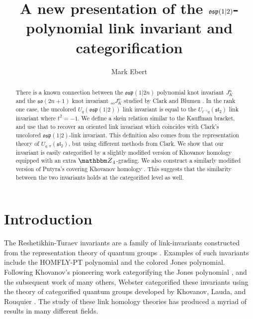 \documentclass{amsart}
\title{A new presentation of the $\mf{osp}(1|2)$-polynomial link invariant and categorification}
\theoremstyle{plain}
\theoremstyle{definition}
\theoremstyle{definition}
\numberwithin{equation}{section}
\numberwithin{theorem}{section}
\def\mf{\mathfrak}
\numberwithin{equation}{section}
\def\Z{{\mathbbm Z}}
\begin{document}
\setcounter{tocdepth}{3}


\author{Mark Ebert}
\address{Department of Mathematics\\ University of Southern California \\ Los Angeles, CA}
%
\maketitle
%
\begin{abstract}
There is a known connection between the $\mf{osp}(1|2n)$ polynomial knot invariant $J_K^n$ and the $\mf{so}(2n+1)$ knot invariant ${}_{so}J_K^n$ studied by Clark \cite{C} and Blumen \cite{Blu09}.
In the rank one case, the uncolored $U_{q}(\mf{osp}(1|2))$ link invariant is equal to the $U_{t^{-1}q}(\mf{sl}_2)$ link invariant where $t^2=-1$.
We define a skein relation similar to the Kauffman bracket, and use that to recover an oriented link invariant which coincides with Clark's uncolored $\mf{osp}(1|2)$-link invariant.
This definition also comes from the representation theory of $U_{q,\pi}(\mf{sl}_2)$, but using different methods from Clark.
We show that our invariant is easily categorified by a slightly modified version of Khovanov homology equipped with an extra $\Z_4$-grading.
We also construct a similarly modified version of Putyra's covering Khovanov homology \cite{P}.
This suggests that the similarity between the two invariants holds at the categorified level as well.
\end{abstract}



%
\section{Introduction}

The Reshetikhin-Turaev invariants are a family of link-invariants constructed from the representation theory of quantum groups \cite{RT90}.
Examples of such invariants include the HOMFLY-PT polynomial and the colored Jones polynomial.
Following Khovanov's pioneering work categorifying the Jones polynomial \cite{K00}, and the subsequent work of many others\cite{Kh03, Sus07, KR08a, KR08b, MS09}, Webster categorified these invariants \cite{Web} using the theory of categorified quantum groups developed by Khovanov, Lauda, and Rouquier \cite{Rou2,KL10}.
The study of these link homology theories has produced a myriad of results in many different fields.
\end{document}
